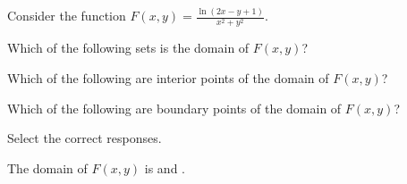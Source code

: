 \documentclass{ximera}
\author{Jim Talamo}
\begin{document}
\begin{exercise}
  Consider the function $F(x,y) = \frac{\ln(2x-y+1)}{x^2+y^2}$.
  
  Which of the following sets is the domain of $F(x,y)$?
  \begin{multipleChoice}
  \choice{$\R$}
  \end{multipleChoice}
 
 Which of the following are interior points of the domain of $F(x,y)$?
 \begin{selectAll}
 \end{selectAll} 

 Which of the following are boundary points of the domain of $F(x,y)$?
 \begin{selectAll}
 \end{selectAll} 

Select the correct responses.

The domain of $F(x,y)$ is  and  .
  \end{exercise}
\end{document}
